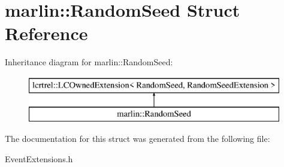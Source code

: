 \section{marlin\+:\+:Random\+Seed Struct Reference}
\label{structmarlin_1_1RandomSeed}
Inheritance diagram for marlin\+:\+:Random\+Seed\+:\begin{figure}[H]
\begin{center}
\leavevmode
\includegraphics[height=2.000000cm]{structmarlin_1_1RandomSeed}
\end{center}
\end{figure}


The documentation for this struct was generated from the following file\+:\begin{DoxyCompactItemize}
\item 
Event\+Extensions.\+h\end{DoxyCompactItemize}
